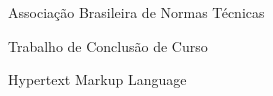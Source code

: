 
\begin{listadesiglas}
  \item[ABNT] Associação Brasileira de Normas Técnicas
  \item[TCC] Trabalho de Conclusão de Curso
  \item[HTML] Hypertext Markup Language
\end{listadesiglas}

